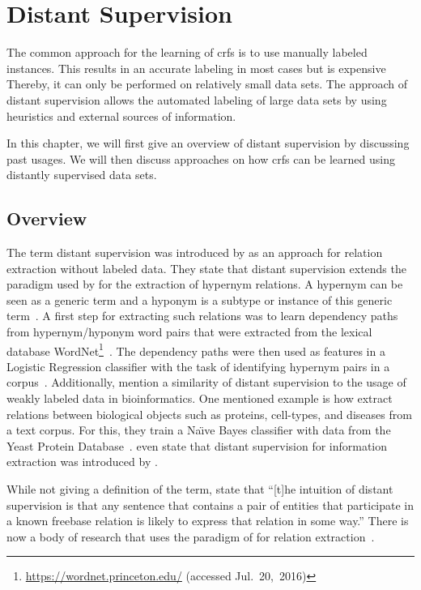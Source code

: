 \chapter{Distant Supervision}\label{cha:distant-supervision}

The common approach for the learning of \glspl{crf} is to use manually labeled instances.
This results in an accurate labeling in most cases but is expensive
Thereby, it can only be performed on relatively small data sets.
The approach of \gls{distant supervision} allows the automated labeling of large data sets by using heuristics and external sources of information.

In this chapter, we will first give an overview of \gls{distant supervision} by discussing past usages.
We will then discuss approaches on how \glspl{crf} can be learned using distantly supervised data sets.

\section{Overview}

The term \gls{distant supervision} was introduced by \citet{mintz2009distant} as an approach for relation extraction without labeled data.
They state that \gls{distant supervision} extends the paradigm used by \citet{snow2005learning} for the extraction of hypernym relations.
A hypernym can be seen as a generic term and a hyponym is a subtype or instance of this generic term~\citep{snow2005learning}.
A first step for extracting such relations was to learn dependency paths from hypernym/hyponym word pairs that were extracted from the lexical database WordNet\footnote{\url{https://wordnet.princeton.edu/} (accessed Jul.~20,~2016)}~\citep{snow2005learning}.
The dependency paths were then used as features in a Logistic Regression classifier with the task of identifying hypernym pairs in a corpus~\citep{snow2005learning}.
Additionally, \citet{mintz2009distant} mention a similarity of \gls{distant supervision} to the usage of weakly labeled data in bioinformatics.
One mentioned example is how \citet{craven1999constructing} extract relations between biological objects such as proteins, cell-types, and diseases from a text corpus.
For this, they train a Na\"{\i}ve Bayes classifier with data from the Yeast Protein Database~\citep{payne1997yeast}.
\citet{surdeanu2012multi} even state that distant supervision for information extraction was introduced by \citet{craven1999constructing}.

While not giving a definition of the term, \citet[p.~2]{mintz2009distant} state that ``[t]he intuition of distant supervision is that any sentence that contains a pair of entities that participate in a known \gls{freebase} relation is likely to express that relation in some way.''
There is now a body of research that uses the paradigm of \citet{mintz2009distant} for relation extraction~\citep{benson2011event,ritter2011named,nguyen2011end,takamatsu2012reducing,xu2013filling}.

